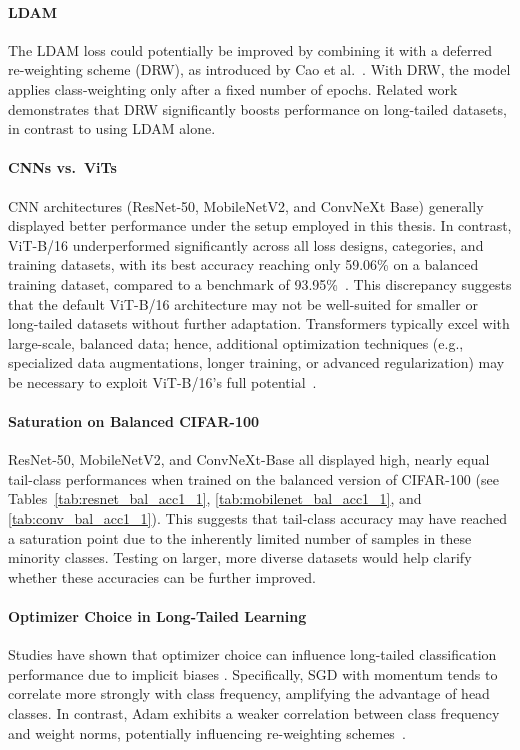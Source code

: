 \paragraph{LDAM}
The LDAM loss could potentially be improved by combining it with a deferred re-weighting scheme (DRW), as introduced by Cao et al.~\cite{cao2019learningimbalanceddatasetslabeldistributionaware}. With DRW, the model applies class-weighting only after a fixed number of epochs. Related work~\cite{menon2021longtaillearninglogitadjustment} demonstrates that DRW significantly boosts performance on long-tailed datasets, in contrast to using LDAM alone.

\paragraph{CNNs vs.\ ViTs}
CNN architectures (ResNet-50, MobileNetV2, and ConvNeXt Base) generally displayed better performance under the setup employed in this thesis. In contrast, ViT-B/16 underperformed significantly across all loss designs, categories, and training datasets, with its best accuracy reaching only 59.06\% on a balanced training dataset, compared to a benchmark of 93.95\%~\cite{ye2023partialfinetuningsuccessorfinetuning}. This discrepancy suggests that the default ViT-B/16 architecture may not be well-suited for smaller or long-tailed datasets without further adaptation. Transformers typically excel with large-scale, balanced data; hence, additional optimization techniques (e.g., specialized data augmentations, longer training, or advanced regularization) may be necessary to exploit ViT-B/16’s full potential~\cite{menon2021longtaillearninglogitadjustment,loshchilov2018fixing}.

\paragraph{Saturation on Balanced CIFAR-100}
ResNet-50, MobileNetV2, and ConvNeXt-Base all displayed high, nearly equal tail-class performances when trained on the balanced version of CIFAR-100 (see Tables~\ref{tab:resnet_bal_acc1_1}, \ref{tab:mobilenet_bal_acc1_1}, and \ref{tab:conv_bal_acc1_1}). This suggests that tail-class accuracy may have reached a saturation point due to the inherently limited number of samples in these minority classes. Testing on larger, more diverse datasets would help clarify whether these accuracies can be further improved.

\paragraph{Optimizer Choice in Long-Tailed Learning}
Studies have shown that optimizer choice can influence long-tailed classification performance due to implicit biases \cite{soudry2024implicitbias,menon2021longtaillearninglogitadjustment}. Specifically, SGD with momentum tends to correlate more strongly with class frequency, amplifying the advantage of head classes. In contrast, Adam exhibits a weaker correlation between class frequency and weight norms, potentially influencing re-weighting schemes~\cite{menon2021longtaillearninglogitadjustment}.

